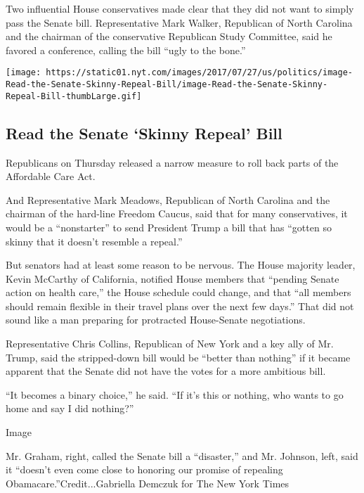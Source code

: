 Two influential House conservatives made clear that they did not want to
simply pass the Senate bill. Representative Mark Walker, Republican of
North Carolina and the chairman of the conservative Republican Study
Committee, said he favored a conference, calling the bill ``ugly to the
bone.''

\href{https://www.nytimes.com/interactive/2017/07/27/us/politics/document-Read-the-Senate-Skinny-Repeal-Bill.html}{}

\texttt{[image: https://static01.nyt.com/images/2017/07/27/us/politics/image-Read-the-Senate-Skinny-Repeal-Bill/image-Read-the-Senate-Skinny-Repeal-Bill-thumbLarge.gif]}

\hypertarget{read-the-senate-skinny-repeal-bill}{%
\subsection{Read the Senate `Skinny Repeal'
Bill}\label{read-the-senate-skinny-repeal-bill}}

Republicans on Thursday released a narrow measure to roll back parts of
the Affordable Care Act.

And Representative Mark Meadows, Republican of North Carolina and the
chairman of the hard-line Freedom Caucus, said that for many
conservatives, it would be a ``nonstarter'' to send President Trump a
bill that has ``gotten so skinny that it doesn't resemble a repeal.''

But senators had at least some reason to be nervous. The House majority
leader, Kevin McCarthy of California, notified House members that
``pending Senate action on health care,'' the House schedule could
change, and that ``all members should remain flexible in their travel
plans over the next few days.'' That did not sound like a man preparing
for protracted House-Senate negotiations.

Representative Chris Collins, Republican of New York and a key ally of
Mr. Trump, said the stripped-down bill would be ``better than nothing''
if it became apparent that the Senate did not have the votes for a more
ambitious bill.

``It becomes a binary choice,'' he said. ``If it's this or nothing, who
wants to go home and say I did nothing?''

Image

Mr. Graham, right, called the Senate bill a ``disaster,'' and Mr.
Johnson, left, said it ``doesn't even come close to honoring our promise
of repealing Obamacare.''Credit...Gabriella Demczuk for The New York
Times


